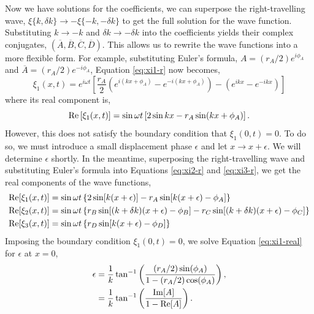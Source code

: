 Now we have solutions for the coefficients, we can superpose the right-travelling wave, \(\xi\{k, \delta k\} \rightarrow - \xi\{-k, -\delta k\}\) to get the full solution for the wave function. Substituting \(k \rightarrow -k\) and \(\delta k \rightarrow -\delta k\) into the coefficients yields their complex conjugates, \((\overline{A},\overline{B},\overline{C},\overline{D})\). This allows us to rewrite the wave functions into a more flexible form. For example, substituting Euler's formula, \(A = (r_A/2) e^{i\phi_A}\) and \(\overline{A} = (r_A/2) e^{-i\phi_A}\), Equation \ref{eq:xi1-r} now becomes,
%
\begin{equation}
    \xi_1(x, t) = e^{i \omega t} \left[ \frac{r_A}{2} \left( e^{i(kx + \phi_A)} - e^{-i(kx + \phi_A)} \right) - \left( e^{ikx} - e^{-ikx} \right) \right] \label{eq:xi1}
\end{equation}
%
where its real component is,
\begin{equation}
    {\mathrm{Re}}\left[\xi_1(x, t)\right] = \sin \omega t \left[2 \sin kx - r_A \sin(kx + \phi_A)\right].
\end{equation}
%
However, this does not satisfy the boundary condition that \(\xi_1(0, t) = 0\). To do so, we must introduce a small displacement phase \(\epsilon\) and let \(x \rightarrow x + \epsilon\). We will determine \(\epsilon\) shortly. In the meantime, superposing the right-travelling wave and substituting Euler's formula into Equations \ref{eq:xi2-r} and \ref{eq:xi3-r}, we get the real components of the wave functions,
%
%
%
\begin{align}
    {\mathrm{Re}}[\xi_1(x, t)] &= \sin \omega t \left\{2 \sin[k (x + \epsilon)] - r_A \sin[k(x + \epsilon) - \phi_A]\right\} \label{eq:xi1-real} \\
    {\mathrm{Re}}[\xi_2(x, t)] &= \sin \omega t \left\{ r_B \sin[(k + \delta k)(x + \epsilon) - \phi_B] - r_C \sin[(k + \delta k)(x + \epsilon) - \phi_C]\right\} \\
    {\mathrm{Re}}[\xi_3(x, t)] &= \sin \omega t \left\{r_D \sin[k(x + \epsilon) - \phi_D]\right\} \label{eq:xi3-real}
\end{align}
%
Imposing the boundary condition \(\xi_1(0, t) = 0\), we solve Equation \ref{eq:xi1-real} for \(\epsilon\) at \(x=0\),
%
\begin{align}
    \epsilon &= \frac{1}{k} \tan^{-1}\left( \frac{(r_A / 2) \sin(\phi_A)}{1 - (r_A/2) \cos(\phi_A)} \right), \notag\\
    &= \frac{1}{k} \tan^{-1}\left( \frac{{\mathrm{Im}}[A]}{1 - {\mathrm{Re}}[A]} \right). \label{eq:1d-phase}
\end{align}
%

